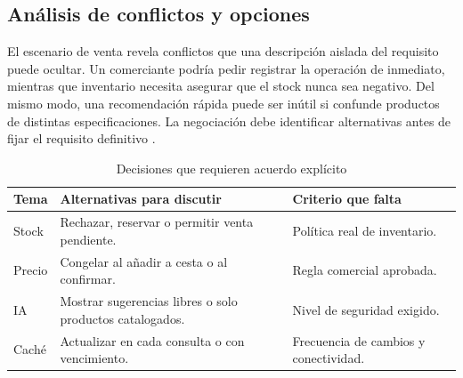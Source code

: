 \subsection{Análisis de conflictos y opciones}
El escenario de venta revela conflictos que una descripción aislada del requisito puede ocultar. Un comerciante podría pedir registrar la operación de inmediato, mientras que inventario necesita asegurar que el stock nunca sea negativo. Del mismo modo, una recomendación rápida puede ser inútil si confunde productos de distintas especificaciones. La negociación debe identificar alternativas antes de fijar el requisito definitivo \cite{pohl2025,swebok2024}.
\begin{table}[!ht]
\centering\scriptsize
\caption{Decisiones que requieren acuerdo explícito}
\label{tab:conflictos14}
\begin{tabularx}{\columnwidth}{@{}P{0.85cm}Y Y@{}}
\toprule Tema & Alternativas para discutir & Criterio que falta\\\midrule
Stock & Rechazar, reservar o permitir venta pendiente. & Política real de inventario.\\
Precio & Congelar al añadir a cesta o al confirmar. & Regla comercial aprobada.\\
IA & Mostrar sugerencias libres o solo productos catalogados. & Nivel de seguridad exigido.\\
Caché & Actualizar en cada consulta o con vencimiento. & Frecuencia de cambios y conectividad.\\
\bottomrule
\end{tabularx}
\end{table}

